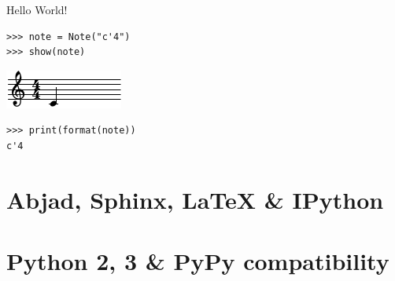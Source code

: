 \documentclass[10pt]{beamer}
\newenvironment{abjadbookoutput}{}{}
\begin{document}
\begin{frame}[fragile]{Hello World!}

\begin{abjadbookoutput}
\begin{singlespacing}
\vspace{-0.5\baselineskip}
\begin{verbatim}
>>> note = Note("c'4")
>>> show(note)
\end{verbatim}
\noindent\includegraphics[max width=\textwidth,]{assets/lilypond-c018a545d264ff34225e9a3a5babb6c1.pdf}
\end{singlespacing}
\end{abjadbookoutput}

\begin{abjadbookoutput}
\begin{singlespacing}
\vspace{-0.5\baselineskip}
\begin{verbatim}
>>> print(format(note))
c'4
\end{verbatim}
\end{singlespacing}
\end{abjadbookoutput}

\end{frame}

\section{Abjad, Sphinx, LaTeX \& IPython}

\section{Python 2, 3 \& PyPy compatibility}
\end{document}
